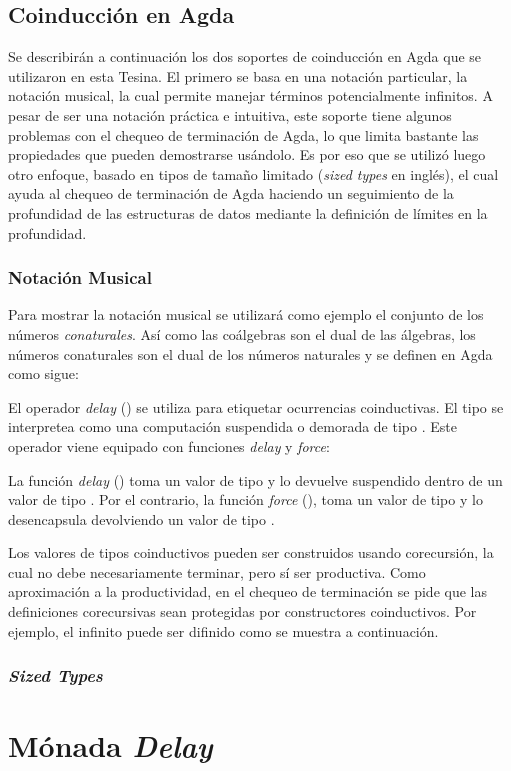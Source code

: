 \subsection{Coinducción en Agda}\label{coind:agda}

Se describirán a continuación los dos soportes de coinducción en Agda que se utilizaron en esta Tesina. El primero se basa en una notación particular, la notación musical, la cual permite manejar términos potencialmente infinitos. A pesar de ser una notación práctica e intuitiva, este soporte tiene algunos problemas con el chequeo de terminación de Agda, lo que limita bastante las propiedades que pueden demostrarse usándolo. Es por eso que se utilizó luego otro enfoque, basado en tipos de tamaño limitado (\textit{sized types} en inglés), el cual ayuda al chequeo de terminación de Agda haciendo un seguimiento de la profundidad de las estructuras de datos mediante la definición de límites en la profundidad. 

\subsubsection{Notación Musical}\label{coind:agda:musical}

Para mostrar la notación musical se utilizará como ejemplo el conjunto de los números \textit{conaturales}. Así como las coálgebras son el dual de las álgebras, los números conaturales son el dual de los números naturales y se definen en Agda como sigue:


El operador \textit{delay} (\AgdaDatatype{$\infty$}) se utiliza para etiquetar ocurrencias coinductivas. El tipo  se interpretea como una computación suspendida o demorada de tipo . Este operador viene equipado con funciones \textit{delay} y \textit{force}:


La función \textit{delay} (\AgdaFunction{$\sharp\_$}) toma un valor de tipo  y lo devuelve suspendido dentro de un valor de tipo . Por el contrario, la función \textit{force} (\AgdaFunction{$\flat$}), toma un valor de tipo  y lo desencapsula devolviendo un valor de tipo .

Los valores de tipos coinductivos pueden ser construidos usando corecursión, la cual no debe necesariamente terminar, pero sí ser productiva. Como aproximación a la productividad, en el chequeo de terminación se pide que las definiciones corecursivas sean protegidas por constructores coinductivos. Por ejemplo, el infinito puede ser difinido como se muestra a continuación.


\subsubsection{\textit{Sized Types}}



\section{Mónada \textit{Delay}}\label{delay:delay}